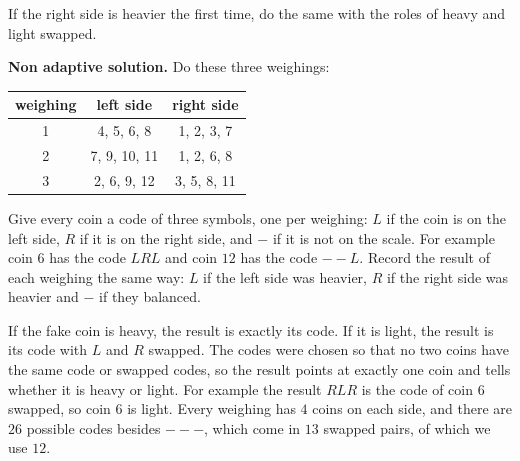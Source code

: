 If the right side is heavier the first time, do the same with the roles of heavy and light swapped.

\textbf{Non adaptive solution.} Do these three weighings:
\begin{center}
\begin{tabular}{c c c}
weighing & left side & right side \\
\hline
1 & 4, 5, 6, 8 & 1, 2, 3, 7 \\
2 & 7, 9, 10, 11 & 1, 2, 6, 8 \\
3 & 2, 6, 9, 12 & 3, 5, 8, 11 \\
\end{tabular}
\end{center}
Give every coin a code of three symbols, one per weighing: $L$ if the coin is on the left side, $R$ if it is on the right side, and $-$ if it is not on the scale.
For example coin $6$ has the code $LRL$ and coin $12$ has the code $--L$.
Record the result of each weighing the same way: $L$ if the left side was heavier, $R$ if the right side was heavier and $-$ if they balanced.

If the fake coin is heavy, the result is exactly its code. If it is light, the result is its code with $L$ and $R$ swapped.
The codes were chosen so that no two coins have the same code or swapped codes, so the result points at exactly one coin and tells whether it is heavy or light.
For example the result $RLR$ is the code of coin $6$ swapped, so coin $6$ is light.
Every weighing has $4$ coins on each side, and there are $26$ possible codes besides $---$, which come in $13$ swapped pairs, of which we use $12$.
